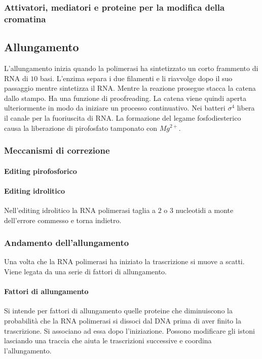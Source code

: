 		\subsubsection{Attivatori, mediatori e proteine per la modifica della cromatina}

	\subsection{Allungamento}
	L'allungamento inizia quando la polimerasi ha sintetizzato un corto frammento di RNA di $10$ basi.
	L'enzima separa i due filamenti e li riavvolge dopo il suo passaggio mentre sintetizza il RNA.
	Mentre la reazione prosegue stacca la catena dallo stampo.
	Ha una funzione di proofreading.
	La catena viene quindi aperta ulteriormente in modo da iniziare un processo continuativo.
	Nei batteri $\sigma^4$  libera il canale per la fuoriuscita di RNA.
	La formazione del legame fosfodiesterico causa la liberazione di pirofosfato tamponato con \emph{$Mg^{2+}$}.

		\subsubsection{Meccanismi di correzione}

			\paragraph{Editing pirofosforico}

			\paragraph{Editing idrolitico}
			Nell'editing idrolitico la RNA polimerasi taglia a $2$ o $3$ nucleotidi a monte dell'errore commesso e torna indietro.

		\subsubsection{Andamento dell'allungamento}
		Una volta che la RNA polimerasi ha iniziato la trascrizione si muove a scatti.
		Viene legata da una serie di fattori di allungamento.

			\paragraph{Fattori di allungamento}
			Si intende per fattori di allungamento quelle proteine che diminuiscono la probabilit\`a che la RNA polimerasi si dissoci dal DNA prima di aver finito la trascrizione.
			Si associano ad essa dopo l'iniziazione.
			Possono modificare gli istoni lasciando una traccia che aiuta le trascrizioni successive e coordina l'allungamento.
			
